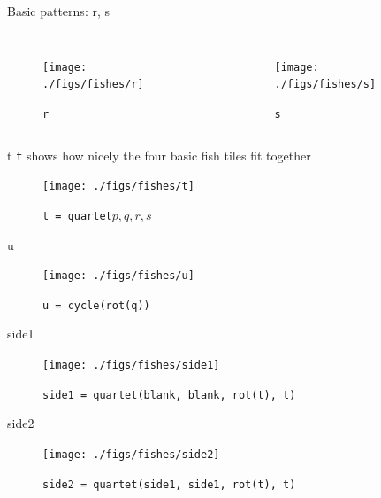 \documentclass{beamer}
\begin{document}
    \begin{frame}{Basic patterns: r, s}
        \begin{columns}[T,onlytextwidth]
                \begin{figure}
                    \centering
                    \texttt{[image: ./figs/fishes/r]}
                    \caption{\texttt{r}\label{fig:r}}
                \end{figure}

                \begin{figure}
                    \centering
                    \texttt{[image: ./figs/fishes/s]}
                    \caption{\texttt{s}\label{fig:s}}
                \end{figure}
        \end{columns}

    \end{frame}

    \begin{frame}{t}
      \texttt{t} shows how nicely the four basic fish tiles fit together
        \begin{figure}
            \centering
            \texttt{[image: ./figs/fishes/t]}
            \caption{\texttt{t = quartet\(p, q, r, s\)}\label{fig:t}}
        \end{figure}
    \end{frame}

    \begin{frame}{u}

        \begin{figure}
            \centering
            \texttt{[image: ./figs/fishes/u]}
            \caption{\texttt{u = cycle(rot(q))}\label{fig:u}}
        \end{figure}

    \end{frame}

    \begin{frame}{side1}

        \begin{figure}
            \centering
            \texttt{[image: ./figs/fishes/side1]}
            \caption{\texttt{side1 = quartet(blank, blank, rot(t), t)}\label{fig:side1}}
        \end{figure}

    \end{frame}

   \begin{frame}{side2}

        \begin{figure}
            \centering
            \texttt{[image: ./figs/fishes/side2]}
            \caption{\texttt{side2 = quartet(side1, side1, rot(t), t)}\label{fig:side2}}
        \end{figure}

    \end{frame}
\end{document}
